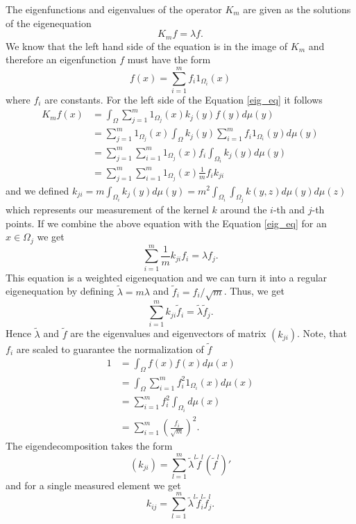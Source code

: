 \documentclass[twoside,11pt]{article}
\begin{document}
The eigenfunctions and eigenvalues of the operator $K_m$
are given as the solutions of the eigenequation
\begin{equation}
K_m f=\lambda f.
\label{eig_eq}
\end{equation}
We know that the left hand side of the equation is in the image of $K_m$
and therefore an eigenfunction $f$ must have the form
\begin{equation}
f(x)=\sum_{i=1}^m f_i 1_{\Omega_i}(x)
\label{eig_func}
\end{equation}
where $f_i$ are constants.
For the left side of the Equation \eqref{eig_eq} it follows
\begin{align*}
K_m f(x)
& = \int_{\Omega} \sum_{j=1}^m 1_{\Omega_j}(x) k_j(y) f(y) d\mu(y) \\
& = \sum_{j=1}^m 1_{\Omega_j}(x) 
\int_{\Omega} k_j(y) \sum_{i=1}^m f_i 1_{\Omega_i}(y) d\mu(y) \\
& = \sum_{j=1}^m \sum_{i=1}^m 1_{\Omega_j}(x) f_i 
\int_{\Omega_i} k_j(y) d\mu(y) \\
& = \sum_{j=1}^m \sum_{i=1}^m 1_{\Omega_j}(x) \frac{1}{m}
f_i k_{ji}
\end{align*}
and we defined
$k_{ji}=m \int_{\Omega_i} k_j(y) d\mu(y)
=m^2 \int_{\Omega_i} \int_{\Omega_j} k(y,z) d\mu(y) d\mu(z)$
which represents our measurement of the kernel $k$ around the $i$-th and $j$-th points.
If we combine the above equation with the Equation \eqref{eig_eq} for an $x \in \Omega_j$
we get
\[
\sum_{i=1}^m \frac{1}{m} k_{ji} f_i = \lambda f_j.
\label{eig_eq_j}
\]
This equation is a weighted eigenequation and we can turn it into a regular eigenequation
by defining $\tilde{\lambda}=m\lambda$
and $\tilde{f}_i = f_i/\sqrt{m}$.
Thus, we get
\[
\sum_{i=1}^m k_{ji} \tilde{f}_i = \tilde{\lambda} \tilde{f}_j.
\]
Hence $\tilde{\lambda}$ and $\tilde{f}$ are the eigenvalues and eigenvectors
of matrix $(k_{ji})$.
Note, that $f_i$ are scaled to guarantee the normalization of $\tilde{f}$
\begin{align*}
1
& = \int_{\Omega} f(x) f(x) d\mu(x) \\
& = \int_{\Omega} \sum_{i=1}^m f_i^2 1_{\Omega_i}(x) d\mu(x)\\
& = \sum_{i=1}^m f_i^2 \int_{\Omega_i} d\mu(x)\\
& = \sum_{i=1}^m \left(\frac{f_i}{\sqrt{m}}\right)^2.
\end{align*}
The eigendecomposition takes the form
\[
(k_{ji}) = \sum_{l=1}^m \tilde{\lambda}^l \tilde{f}^l (\tilde{f}^l)'
\]
and for a single measured element we get
\[
k_{ij} = \sum_{l=1}^m \tilde{\lambda}^l \tilde{f}^l_i \tilde{f}^l_j.
\]
\end{document}
